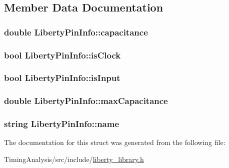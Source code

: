 \subsection{Member Data Documentation}
\hypertarget{structLibertyPinInfo_a8668778fc79c36a4cdcedf9a3f7e91b4}{
\subsubsection[{capacitance}]{\setlength{\rightskip}{0pt plus 5cm}double Liberty\-Pin\-Info\-::capacitance}}\label{structLibertyPinInfo_a8668778fc79c36a4cdcedf9a3f7e91b4}
\hypertarget{structLibertyPinInfo_a8200642f454380e2e22f4158d471c302}{
\subsubsection[{is\-Clock}]{\setlength{\rightskip}{0pt plus 5cm}bool Liberty\-Pin\-Info\-::is\-Clock}}\label{structLibertyPinInfo_a8200642f454380e2e22f4158d471c302}
\hypertarget{structLibertyPinInfo_a57daad21ecac17f40631e0c563f7f39d}{
\subsubsection[{is\-Input}]{\setlength{\rightskip}{0pt plus 5cm}bool Liberty\-Pin\-Info\-::is\-Input}}\label{structLibertyPinInfo_a57daad21ecac17f40631e0c563f7f39d}
\hypertarget{structLibertyPinInfo_a8eb7d3102925e3ecf9906ade7c82b0b7}{
\subsubsection[{max\-Capacitance}]{\setlength{\rightskip}{0pt plus 5cm}double Liberty\-Pin\-Info\-::max\-Capacitance}}\label{structLibertyPinInfo_a8eb7d3102925e3ecf9906ade7c82b0b7}
\hypertarget{structLibertyPinInfo_a4421a56d0603f0d8371a48c123832aed}{
\subsubsection[{name}]{\setlength{\rightskip}{0pt plus 5cm}string Liberty\-Pin\-Info\-::name}}\label{structLibertyPinInfo_a4421a56d0603f0d8371a48c123832aed}


The documentation for this struct was generated from the following file\-:\begin{DoxyCompactItemize}
\item 
Timing\-Analysis/src/include/\hyperlink{liberty__library_8h}{liberty\-\_\-library.\-h}\end{DoxyCompactItemize}

